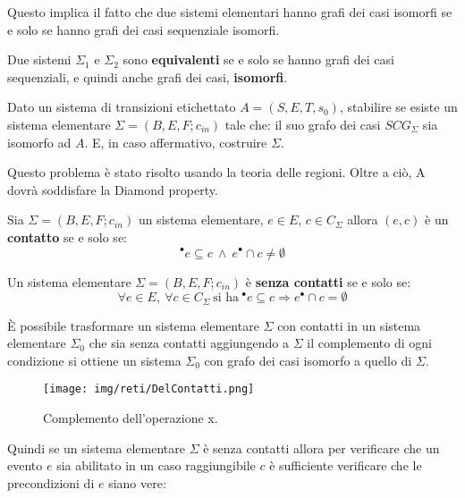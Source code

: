 Questo implica il fatto che due sistemi elementari hanno grafi dei casi isomorfi se e solo se hanno grafi dei casi sequenziale isomorfi.
\begin{definizione}
    Due sistemi $\Sigma_1$ e $\Sigma_2$ sono \textbf{equivalenti} se e solo se hanno grafi dei casi sequenziali, e quindi anche grafi dei casi, \textbf{isomorfi}.
\end{definizione}
\begin{definizione}
    Dato un sistema di transizioni etichettato $A = (S, E,T,s_0)$, stabilire se esiste un sistema elementare $\Sigma = (B, E, F; c_{in})$ tale che: il suo grafo dei casi $SCG_{\Sigma}$ sia isomorfo ad $A$. E, in caso affermativo, costruire $\Sigma$.

    Questo problema è stato risolto usando la teoria delle regioni. Oltre a ciò, A dovrà soddisfare la Diamond property.
\end{definizione}
\begin{definizione}
    Sia $\Sigma = (B, E, F; c_{in})$ un sistema elementare, $e \in E$, $c \in C_{\Sigma}$ allora $(e, c)$ è un \textbf{contatto} se e solo se:
    \begin{equation}
        ^{\bullet}e \subseteq c \ \land \ e^{\bullet} \cap c \neq \emptyset
    \end{equation}
\end{definizione}
\begin{definizione}
    Un sistema elementare $\Sigma = (B, E, F; c_{in})$ è \textbf{senza contatti} se e solo se:
    \begin{equation}
        \forall e \in E, \ \forall c \in C_{\Sigma} \ \text{si ha} \ ^{\bullet}e \subseteq c \Rightarrow e^{\bullet} \cap c = \emptyset
    \end{equation}
\end{definizione}
È possibile trasformare un sistema elementare $\Sigma$ con contatti in un
sistema elementare $\Sigma_0$ che sia senza contatti aggiungendo a $\Sigma$ il complemento di ogni condizione si ottiene un sistema $\Sigma_0$ con grafo dei casi isomorfo a quello di $\Sigma$.
\begin{figure}[!ht]
    \centering
    \texttt{[image: img/reti/DelContatti.png]}
    \caption{Complemento dell'operazione x.}
\end{figure}
Quindi se un sistema elementare $\Sigma$ è senza contatti allora per verificare che un evento $e$ sia abilitato in un caso raggiungibile $c$ è sufficiente verificare che le precondizioni di $e$ siano vere:
